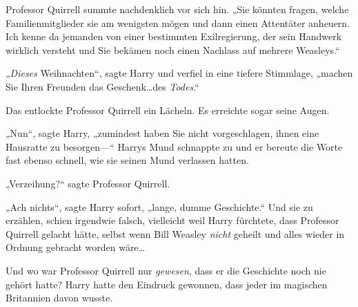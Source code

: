 Professor Quirrell summte nachdenklich vor sich hin. „Sie könnten fragen, welche Familienmitglieder sie am wenigsten mögen und dann einen Attentäter anheuern. Ich kenne da jemanden von einer bestimmten Exilregierung, der sein Handwerk wirklich versteht und Sie bekämen noch einen Nachlass auf mehrere Weasleys.“

„\emph{Dieses} Weihnachten“, sagte Harry und verfiel in eine tiefere Stimmlage, „machen Sie Ihren Freunden das Geschenk…des \emph{Todes}.“

Das entlockte Professor Quirrell ein Lächeln. Es erreichte sogar seine Augen.

„Nun“, sagte Harry, „zumindest haben Sie nicht vorgeschlagen, ihnen eine Hausratte zu besorgen—“ Harrys Mund schnappte zu und er bereute die Worte fast ebenso schnell, wie sie seinen Mund verlassen hatten.

„Verzeihung?“ sagte Professor Quirrell.

„Ach nichts“, sagte Harry sofort, „lange, dumme Geschichte.“ Und sie zu erzählen, schien irgendwie falsch, vielleicht weil Harry fürchtete, dass Professor Quirrell gelacht hätte, selbst wenn Bill Weasley \emph{nicht} geheilt und alles wieder in Ordnung gebracht worden wäre…

Und wo war Professor Quirrell nur \emph{gewesen}, dass er die Geschichte noch nie gehört hatte? Harry hatte den Eindruck gewonnen, dass jeder im magischen Britannien davon wusste.

